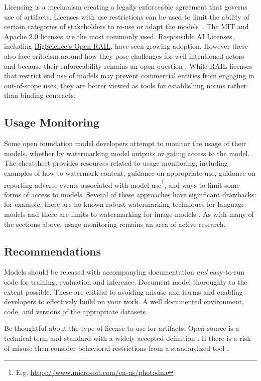 Licensing is a mechanism creating a legally enforceable agreement that governs use of artifacts. Licenses with use restrictions can be used to limit the ability of certain categories of stakeholders to re-use or adapt the models~\citep{contractor2022behavioral,FSF2024what}. The MIT and Apache 2.0 licenses are the most commonly used. 
Responsible AI Licenses, including \href{}{BigScience's Open RAIL}, have seen growing adoption. However these also face criticism around how they pose challenges for well-intentioned actors and because their enforceability remains an open question \citep{downing2023licensing}. While RAIL licenses that restrict end use of models may prevent commercial entities from engaging in out-of-scope uses, they are better viewed as tools for establishing norms rather than binding contracts.

\subsection{Usage Monitoring}

Some open foundation model developers attempt to monitor the usage of their models, whether by watermarking model outputs or gating access to the model. The cheatsheet provides resources related to usage monitoring, including examples of how to watermark content, guidance on appropriate use, guidance on reporting adverse events associated with model use\footnote{E.g. \url{https://www.microsoft.com/en-us/photodna}}, and ways to limit some forms of access to models. 
Several of these approaches have significant drawbacks: for example, there are no known robust watermarking techniques for language models and there are limits to watermarking for image models \citep{kirchenbauer2023watermark,saberi2023robustness}. As with many of the sections above, usage monitoring remains an area of active research. 

\subsection{Recommendations}
Models should be released with accompanying documentation \emph{and} easy-to-run code for training, evaluation and inference. Document model thoroughly to the extent possible. These are critical to avoiding misuse and harms and enabling developers to effectively build on your work. A well documented environment, code, and versions of the appropriate datasets.

Be thoughtful about the type of license to use for artifacts. Open source is a technical term and standard with a widely accepted definition \citep{OSI2024def}. If there is a risk of misuse then consider behavioral restrictions from a standardized tool \citep{mcduff2024standardization}.

